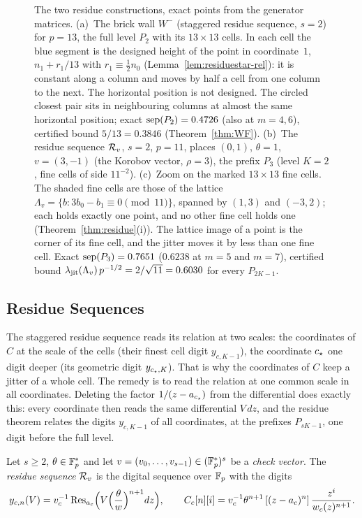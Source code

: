 \begin{figure}[t]
\centering
{}
\caption{The two residue constructions, exact points from the generator matrices. (a)~The brick wall $W^-$ (staggered residue sequence, $s=2$) for $p=13$, the full level $P_2$ with its $13\times13$ cells. In each cell the blue segment is the designed height of the point in coordinate~$1$, $n_1+r_1/13$ with $r_1\equiv\frac12n_0$ (Lemma~\ref{lem:residuestar-rel}): it is constant along a column and moves by half a cell from one column to the next. The horizontal position is not designed. The circled closest pair sits in neighbouring columns at almost the same horizontal position; exact $\operatorname{sep}(P_2)=0.4726$ (also at $m=4,6$), certified bound $5/13=0.3846$ (Theorem~\ref{thm:WF}). (b)~The residue sequence $\mathcal{R}_v$, $s=2$, $p=11$, places $(0,1)$, $\theta=1$, $v=(3,-1)$ (the Korobov vector, $\rho=3$), the prefix $P_3$ (level $K=2$, fine cells of side $11^{-2}$). (c)~Zoom on the marked $13\times13$ fine cells. The shaded fine cells are those of the lattice $\Lambda_v=\{b:3b_0-b_1\equiv0\pmod{11}\}$, spanned by $(1,3)$ and $(-3,2)$; each holds exactly one point, and no other fine cell holds one (Theorem~\ref{thm:residue}(i)). The lattice image of a point is the corner of its fine cell, and the jitter moves it by less than one fine cell. Exact $\operatorname{sep}(P_3)=0.7651$ ($0.6238$ at $m=5$ and $m=7$), certified bound $\lambda_{\mathrm{jit}}(\Lambda_v)\,p^{-1/2}=2/\sqrt{11}=0.6030$ for every $P_{2K-1}$.}
\label{fig:residue}
\end{figure}

\subsection{Residue Sequences}\label{sec:residueseq}
The staggered residue sequence reads its relation at two scales: the coordinates of $C$ at the scale of the cells (their finest cell digit $y_{c,K-1}$), the coordinate $c_{\star}$ one digit deeper (its geometric digit $y_{c_{\star},K}$). That is why the coordinates of $C$ keep a jitter of a whole cell. The remedy is to read the relation at one common scale in all coordinates. Deleting the factor $1/(z-a_{c_{\star}})$ from the differential does exactly this: every coordinate then reads the same differential $V\,dz$, and the residue theorem relates the digits $y_{c,K-1}$ of all coordinates, at the prefixes $P_{sK-1}$, one digit before the full level.

\begin{definition}\label{def:residue}
Let $s\ge2$, $\theta\in\mathbb{F}_p^*$ and let $v=(v_0,\dots,v_{s-1})\in(\mathbb{F}_p^*)^s$ be a \emph{check vector}. The \emph{residue sequence} $\mathcal{R}_v$ is the digital sequence over $\mathbb{F}_p$ with the digits
\[
y_{c,n}(V)=v_c^{-1}\operatorname{Res}_{a_c}\Bigl(V\Bigl(\frac\theta w\Bigr)^{n+1}dz\Bigr),\qquad C_c[n][i]=v_c^{-1}\theta^{n+1}\,[(z-a_c)^n]\,\frac{z^i}{w_c(z)^{n+1}} .
\]
\end{definition}

